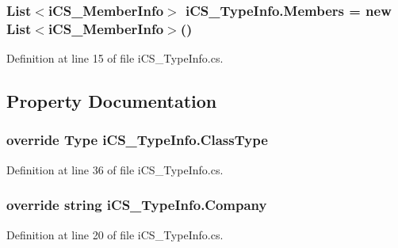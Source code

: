 \hypertarget{classi_c_s___type_info_a40c8ae26aa58297f50a8a93e5893f7cc}{
\subsubsection[{Members}]{\setlength{\rightskip}{0pt plus 5cm}List$<${\bf i\+C\+S\+\_\+\+Member\+Info}$>$ i\+C\+S\+\_\+\+Type\+Info.\+Members = new List$<${\bf i\+C\+S\+\_\+\+Member\+Info}$>$()}}\label{classi_c_s___type_info_a40c8ae26aa58297f50a8a93e5893f7cc}


Definition at line 15 of file i\+C\+S\+\_\+\+Type\+Info.\+cs.



\subsection{Property Documentation}
\hypertarget{classi_c_s___type_info_aa307f36813a63e09f6497a0d7ae46b7e}{
\subsubsection[{Class\+Type}]{\setlength{\rightskip}{0pt plus 5cm}override {\bf Type} i\+C\+S\+\_\+\+Type\+Info.\+Class\+Type\hspace{0.3cm}{\ttfamily [get]}}}\label{classi_c_s___type_info_aa307f36813a63e09f6497a0d7ae46b7e}


Definition at line 36 of file i\+C\+S\+\_\+\+Type\+Info.\+cs.

\hypertarget{classi_c_s___type_info_a7cfe439482ac2cdd0eb2ed9bfc06ee06}{
\subsubsection[{Company}]{\setlength{\rightskip}{0pt plus 5cm}override string i\+C\+S\+\_\+\+Type\+Info.\+Company\hspace{0.3cm}{\ttfamily [get]}}}\label{classi_c_s___type_info_a7cfe439482ac2cdd0eb2ed9bfc06ee06}


Definition at line 20 of file i\+C\+S\+\_\+\+Type\+Info.\+cs.

